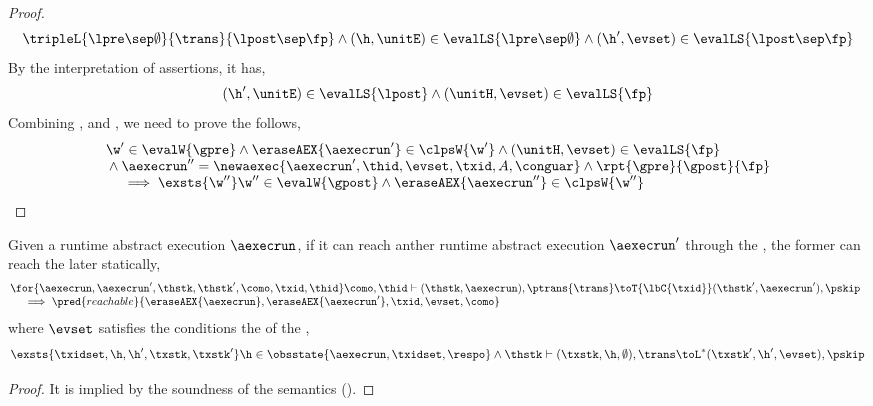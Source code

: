 \begin{proof}
\[ 
\tripleL{\lpre \sep \emptyset}{\trans}{\lpost \sep \fp} \land (\h, \unitE) \in \evalLS{\lpre \sep \emptyset} \land (\h', \evset) \in \evalLS{\lpost \sep \fp}
\]
By the interpretation of assertions, it has,
\begin{equation}
\label{equ:interpretation-local-post}        
(\h', \unitE) \in \evalLS{\lpost} \land (\unitH, \evset) \in \evalLS{\fp}
\end{equation}
Combining ,  and , we need to prove the follows,
\[
    \begin{array}[t]{@{}l@{}}
    \w' \in \evalW{\gpre} 
    \land \eraseAEX{ \aexecrun' } \in \clpsW{\w'}
    \land (\unitH, \evset) \in \evalLS{\fp} \\
    {} \land \aexecrun'' = \newaexec{\aexecrun', \thid, \evset, \txid, A, \conguar } 
    \land \rpt{\gpre}{\gpost}{\fp} \\
    \quad {} \implies 
    \exsts{\w''}
    \w'' \in \evalW{\gpost} 
    \land \eraseAEX{ \aexecrun'' } \in \clpsW{\w''}
    \end{array}
\]
\end{proof}

\begin{lem}
\label{lem:reachable}
Given a runtime abstract execution \( \aexecrun \), if it can reach anther runtime abstract execution \( \aexecrun'\) through the , the former can reach the later statically, \ie
\[
\begin{array}{@{}l}
    \for{\aexecrun, \aexecrun', \thstk, \thstk', \como, \txid, \thid}
    \como, \thid \vdash (\thstk, \aexecrun), \ptrans{\trans}
    \toT{\lbC{\txid}} (\thstk', \aexecrun'), \pskip \\
    \quad {} \implies \pred{reachable}{\eraseAEX{\aexecrun}, \eraseAEX{\aexecrun'}, \txid, \evset, \como}
\end{array}
\]  
where \( \evset \) satisfies the conditions the of the ,
\[
    \exsts{\txidset, \h, \h', \txstk, \txstk'} \h \in \obsstate{\aexecrun, \txidset, \respo} \land \thstk \vdash (\txstk, \h, \emptyset), \trans \toL^{*} (\txstk', \h', \evset ), \pskip
\]
\end{lem}
\begin{proof}
It is implied by the soundness of the semantics ().
\end{proof}

